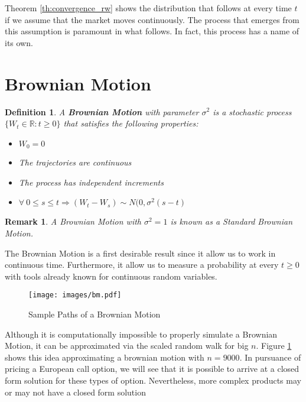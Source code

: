 \documentclass[11pt]{report}
\newtheorem{definition}{Definition}[chapter]
\newtheorem{remark}{Remark}[chapter]
\newcommand{\RNums}{\mathbb{R}}
\begin{document}
Theorem \ref{th:convergence_rw} shows the distribution that follows at every time $t$ if we assume that the market moves continuously. The process that emerges from this assumption is paramount in what follows. In fact, this process has a name of its own.

\section{Brownian Motion}
\begin{definition}\label{def:brownian_motion}
	A \textbf{Brownian Motion} with parameter $\sigma^2$ is a stochastic process $\{W_t \in \RNums:t\geq 0\}$ that satisfies the following properties:
	\begin{itemize}
		\item $W_0 = 0$
		\item The trajectories are continuous
		\item The process has independent increments
		\item $\forall \ 0 \leq s \leq t \Longrightarrow (W_t - W_s) \sim N(0, \sigma^2(s - t)$
	\end{itemize}
\end{definition}

\begin{remark}
	A Brownian Motion with $\sigma^2 = 1$ is known as a Standard Brownian Motion.
\end{remark}

The Brownian Motion is a first desirable result since it allow us to work in continuous time. Furthermore, it allow us to measure a probability at every $t\geq 0$ with tools already known for continuous random variables. 

\begin{figure}[h]
	\centering
	\label{fig:Brownian_Motion}
	\texttt{[image: images/bm.pdf]}	
	\caption{Sample Paths of a Brownian Motion}
\end{figure}

Although it is computationally impossible to properly simulate a Brownian Motion, it can be approximated via the scaled random walk for big $n$. Figure \ref{fig:Brownian_Motion} shows this idea approximating a brownian motion with $n=9000$. In pursuance of pricing a European call option, we will see that it is possible to arrive at a closed form solution for these types of option. Nevertheless, more complex products may or may not have a closed form solution\\
\end{document}
